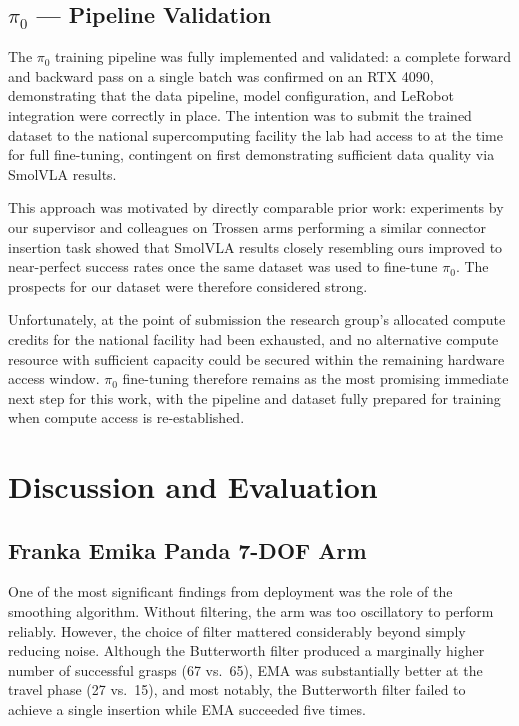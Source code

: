 \documentclass[conference]{IEEEtran}
\begin{document}
\subsection{\texorpdfstring{$\pi_0$}{Pi0} --- Pipeline Validation}

The $\pi_0$ training pipeline was fully implemented and validated: a complete forward and backward pass on a single batch was confirmed on an RTX 4090, demonstrating that the data pipeline, model configuration, and LeRobot integration were correctly in place. The intention was to submit the trained dataset to the national supercomputing facility the lab had access to at the time for full fine-tuning, contingent on first demonstrating sufficient data quality via SmolVLA results.

This approach was motivated by directly comparable prior work: experiments by our supervisor and colleagues on Trossen arms performing a similar connector insertion task showed that SmolVLA results closely resembling ours improved to near-perfect success rates once the same dataset was used to fine-tune $\pi_0$. The prospects for our dataset were therefore considered strong.

Unfortunately, at the point of submission the research group's allocated compute credits for the national facility had been exhausted, and no alternative compute resource with sufficient capacity could be secured within the remaining hardware access window. $\pi_0$ fine-tuning therefore remains as the most promising immediate next step for this work, with the pipeline and dataset fully prepared for training when compute access is re-established.

\section{Discussion and Evaluation} %
\label{sec:discussion}

\subsection{Franka Emika Panda 7-DOF Arm}

One of the most significant findings from deployment was the role of the smoothing algorithm. Without filtering, the arm was too oscillatory to perform reliably. However, the choice of filter mattered considerably beyond simply reducing noise. Although the Butterworth filter produced a marginally higher number of successful grasps (67 vs.\ 65), EMA was substantially better at the travel phase (27 vs.\ 15), and most notably, the Butterworth filter failed to achieve a single insertion while EMA succeeded five times.
\end{document}
